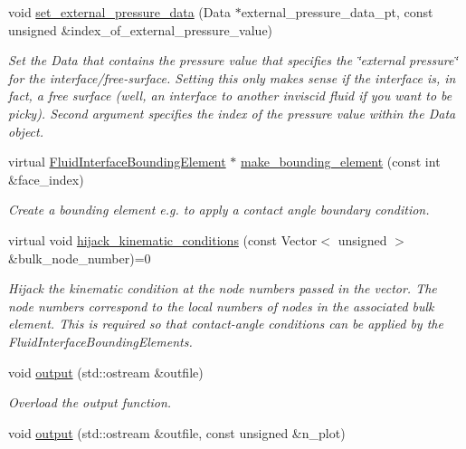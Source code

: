 \begin{DoxyCompactItemize}
void \hyperlink{classoomph_1_1FluidInterfaceElement_a87ee1f3227c456a4c30df77c4d0bad6b}{set\+\_\+external\+\_\+pressure\+\_\+data} (Data $\ast$external\+\_\+pressure\+\_\+data\+\_\+pt, const unsigned \&index\+\_\+of\+\_\+external\+\_\+pressure\+\_\+value)
\begin{DoxyCompactList}\small\item\em Set the Data that contains the pressure value that specifies the \char`\"{}external pressure\char`\"{} for the interface/free-\/surface. Setting this only makes sense if the interface is, in fact, a free surface (well, an interface to another inviscid fluid if you want to be picky). Second argument specifies the index of the pressure value within the Data object. \end{DoxyCompactList}\item 
virtual \hyperlink{classoomph_1_1FluidInterfaceBoundingElement}{Fluid\+Interface\+Bounding\+Element} $\ast$ \hyperlink{classoomph_1_1FluidInterfaceElement_a376f8d1d451890b5725c7a991c34b6fc}{make\+\_\+bounding\+\_\+element} (const int \&face\+\_\+index)
\begin{DoxyCompactList}\small\item\em Create a bounding element e.\+g. to apply a contact angle boundary condition. \end{DoxyCompactList}\item 
virtual void \hyperlink{classoomph_1_1FluidInterfaceElement_a7eb949642baee233779e4f92478ea341}{hijack\+\_\+kinematic\+\_\+conditions} (const Vector$<$ unsigned $>$ \&bulk\+\_\+node\+\_\+number)=0
\begin{DoxyCompactList}\small\item\em Hijack the kinematic condition at the node numbers passed in the vector. The node numbers correspond to the local numbers of nodes in the associated bulk element. This is required so that contact-\/angle conditions can be applied by the Fluid\+Interface\+Bounding\+Elements. \end{DoxyCompactList}\item 
void \hyperlink{classoomph_1_1FluidInterfaceElement_aba83fbd0679ffca4ef6aa32f7aa5d179}{output} (std\+::ostream \&outfile)
\begin{DoxyCompactList}\small\item\em Overload the output function. \end{DoxyCompactList}\item 
void \hyperlink{classoomph_1_1FluidInterfaceElement_a213b1a40132a9605ee8bd31c88b225e0}{output} (std\+::ostream \&outfile, const unsigned \&n\+\_\+plot)

\end{DoxyCompactItemize}
